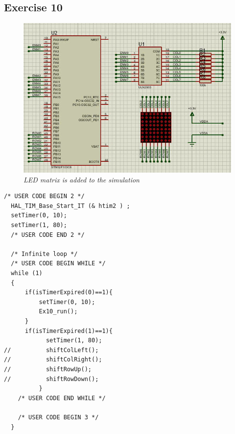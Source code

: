 \subsection{Exercise 10}
\begin{figure}[!htp]
    \centering
    \includegraphics[width=5.5in]{source/picture/bai_2/pic9.jpg}
    \caption{\textit{LED matrix is added to the simulation}}
    \label{bai2_pic9}
\end{figure}
\begin{lstlisting}[caption=main.c]
/* USER CODE BEGIN 2 */
  HAL_TIM_Base_Start_IT (& htim2 ) ;
  setTimer(0, 10);
  setTimer(1, 80);
  /* USER CODE END 2 */

  /* Infinite loop */
  /* USER CODE BEGIN WHILE */
  while (1)
  {
	  if(isTimerExpired(0)==1){
		  setTimer(0, 10);
		  Ex10_run();
	  }
	  if(isTimerExpired(1)==1){
	  		setTimer(1, 80);
//	  		shiftColLeft();
//	  		shiftColRight();
//	  		shiftRowUp();
//	  		shiftRowDown();
	  	  }
    /* USER CODE END WHILE */

    /* USER CODE BEGIN 3 */
  }
\end{lstlisting}
